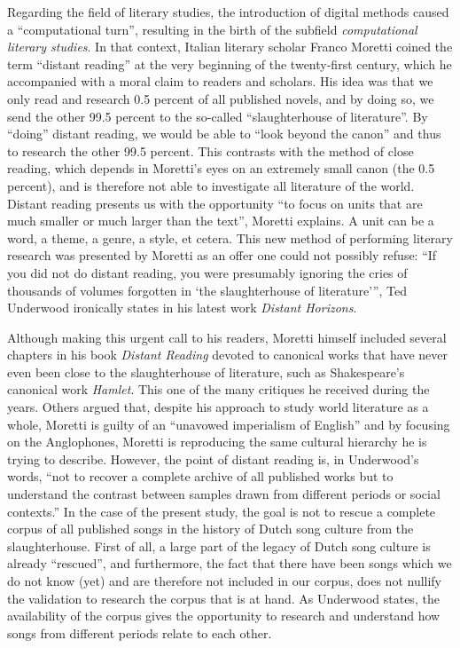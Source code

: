 \noindent Regarding the field of literary studies, the introduction of digital methods caused a \enquote{computational turn}, resulting in the birth of the subfield \textit{computational literary studies}. In that context, Italian literary scholar Franco Moretti coined the term \enquote{distant reading} at the very beginning of the twenty-first century, which he accompanied with a moral claim to readers and scholars. His idea was that we only read and research 0.5 percent of all published novels, and by doing so, we send the other 99.5 percent to the so-called \enquote{slaughterhouse of literature}.\autocite{moretti_slaughterhouse_2000} By \enquote{doing} distant reading, we would be able to \enquote{look beyond the canon}\autocite[57]{moretti_conjectures_2000} and thus to research the other 99.5 percent. This contrasts with the method of close reading, which depends in Moretti's eyes on an extremely small canon (the 0.5 percent), and is therefore not able to investigate all literature of the world. Distant reading presents us with the opportunity \enquote{to focus on units that are much smaller or much larger than the text}, Moretti explains.\autocite[57]{moretti_conjectures_2000} A unit can be a word, a theme, a genre, a style, et cetera. This new method of performing literary research was presented by Moretti as an offer one could not possibly refuse: \enquote{If you did not do distant reading, you were presumably ignoring the cries of thousands of volumes forgotten in \enquote*{the slaughterhouse of literature}}, Ted Underwood ironically states in his latest work \textit{Distant Horizons}.\autocite[xx]{underwood_distant_2019}

Although making this urgent call to his readers, Moretti himself included several chapters in his book \textit{Distant Reading} devoted to canonical works that have never even been close to the slaughterhouse of literature, such as Shakespeare's canonical work \textit{Hamlet}.\autocite{moretti_distant_2013} This one of the many critiques he received during the years. Others argued that, despite his approach to study world literature as a whole, Moretti is guilty of an \enquote{unavowed imperialism of English} \autocite{arac_anglo-globalism_2002} and by focusing on the Anglophones, Moretti is reproducing the same cultural hierarchy he is trying to describe.\autocite{serlen_distant_2010} However, the point of distant reading is, in Underwood's words, \enquote{not to recover a complete archive of all published works but to understand the contrast between samples drawn from different periods or social contexts.}\autocite[xx]{underwood_distant_2019} In the case of the present study, the goal is not to rescue a complete corpus of all published songs in the history of Dutch song culture from the slaughterhouse. First of all, a large part of the legacy of Dutch song culture is already \enquote{rescued}, and furthermore, the fact that there have been songs which we do not know (yet) and are therefore not included in our corpus, does not nullify the validation to research the corpus that is at hand. As Underwood states, the availability of the corpus gives the opportunity to research and understand how songs from different periods relate to each other.

